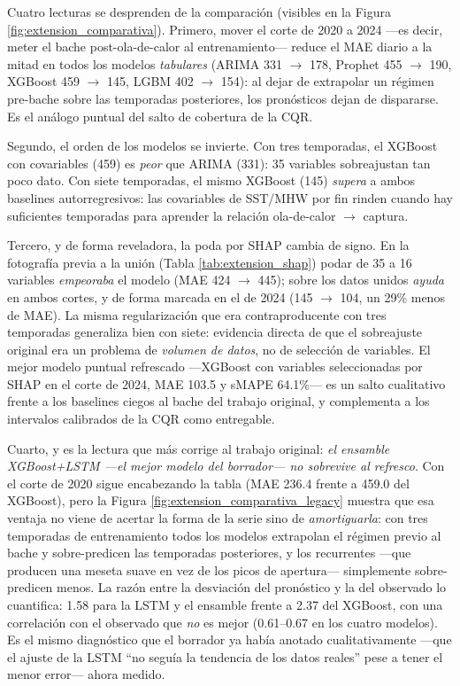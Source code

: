 \documentclass[twoside,11pt]{article}
\begin{document}
Cuatro lecturas se desprenden de la comparación (visibles en la Figura \ref{fig:extension_comparativa}). Primero, mover el corte de 2020 a 2024 ---es decir, meter el bache post-ola-de-calor al entrenamiento--- reduce el MAE diario a la mitad en todos los modelos \emph{tabulares} (ARIMA 331 $\to$ 178, Prophet 455 $\to$ 190, XGBoost 459 $\to$ 145, LGBM 402 $\to$ 154): al dejar de extrapolar un régimen pre-bache sobre las temporadas posteriores, los pronósticos dejan de dispararse. Es el análogo puntual del salto de cobertura de la CQR.

Segundo, el orden de los modelos se invierte. Con tres temporadas, el XGBoost con covariables (459) es \emph{peor} que ARIMA (331): 35 variables sobreajustan tan poco dato. Con siete temporadas, el mismo XGBoost (145) \emph{supera} a ambos baselines autorregresivos: las covariables de SST/MHW por fin rinden cuando hay suficientes temporadas para aprender la relación ola-de-calor $\to$ captura.

Tercero, y de forma reveladora, la poda por SHAP cambia de signo. En la fotografía previa a la unión (Tabla \ref{tab:extension_shap}) podar de 35 a 16 variables \emph{empeoraba} el modelo (MAE 424 $\to$ 445); sobre los datos unidos \emph{ayuda} en ambos cortes, y de forma marcada en el de 2024 (145 $\to$ 104, un 29\% menos de MAE). La misma regularización que era contraproducente con tres temporadas generaliza bien con siete: evidencia directa de que el sobreajuste original era un problema de \emph{volumen de datos}, no de selección de variables. El mejor modelo puntual refrescado ---XGBoost con variables seleccionadas por SHAP en el corte de 2024, MAE 103.5 y sMAPE 64.1\%--- es un salto cualitativo frente a los baselines ciegos al bache del trabajo original, y complementa a los intervalos calibrados de la CQR como entregable.

Cuarto, y es la lectura que más corrige al trabajo original: \emph{el ensamble XGBoost+LSTM ---el mejor modelo del borrador--- no sobrevive al refresco}. Con el corte de 2020 sigue encabezando la tabla (MAE 236.4 frente a 459.0 del XGBoost), pero la Figura \ref{fig:extension_comparativa_legacy} muestra que esa ventaja no viene de acertar la forma de la serie sino de \emph{amortiguarla}: con tres temporadas de entrenamiento todos los modelos extrapolan el régimen previo al bache y sobre-predicen las temporadas posteriores, y los recurrentes ---que producen una meseta suave en vez de los picos de apertura--- simplemente sobre-predicen menos. La razón entre la desviación del pronóstico y la del observado lo cuantifica: 1.58 para la LSTM y el ensamble frente a 2.37 del XGBoost, con una correlación con el observado que \emph{no} es mejor (0.61--0.67 en los cuatro modelos). Es el mismo diagnóstico que el borrador ya había anotado cualitativamente ---que el ajuste de la LSTM ``no seguía la tendencia de los datos reales'' pese a tener el menor error--- ahora medido.
\end{document}

